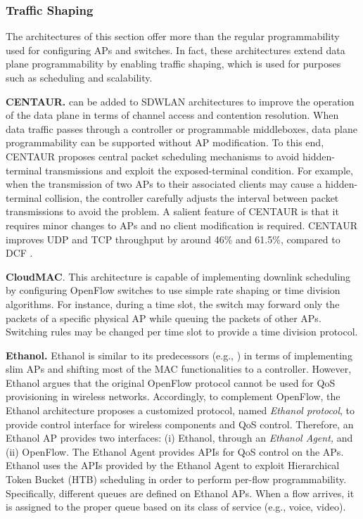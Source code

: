 \subsubsection{\textbf{Traffic Shaping}}
The architectures of this section offer more than the regular programmability used for configuring APs and switches.
In fact, these architectures extend data plane programmability by enabling traffic shaping, which is used for purposes such as scheduling and scalability.


\textbf{CENTAUR.} \cite{CENTAUR } can be added to SDWLAN architectures to improve the operation of the data plane in terms of channel access and contention resolution.
When data traffic passes through a controller or programmable middleboxes, data plane programmability can be supported without AP modification.
To this end, CENTAUR proposes central packet scheduling mechanisms to avoid hidden-terminal transmissions and exploit the exposed-terminal condition.
For example, when the transmission of two APs to their associated clients may cause a hidden-terminal collision, the controller carefully adjusts the interval between packet transmissions to avoid the problem.
A salient feature of CENTAUR is that it requires minor changes to APs and no client modification is required.
CENTAUR improves UDP and TCP throughput by around 46\% and 61.5\%, compared to DCF \cite{bianchi2005remarks}.


\textbf{CloudMAC}. This architecture \cite{CloudMAC} is capable of implementing downlink scheduling by configuring OpenFlow switches to use simple rate shaping or time division algorithms.
For instance, during a time slot, the switch may forward only the packets of a specific physical AP while queuing the packets of other APs. 
Switching rules may be changed per time slot to provide a time division protocol.



\textbf{Ethanol.}
\label{EthanolArch}
Ethanol \cite{Ethanol} is similar to its predecessors (e.g., \cite{Odin,CloudMAC}) in terms of implementing slim APs and shifting most of the MAC functionalities to a controller.
However, Ethanol argues that the original OpenFlow protocol cannot be used for QoS provisioning in wireless networks.
Accordingly, to complement OpenFlow, the Ethanol architecture proposes a customized protocol, named \textit{Ethanol protocol}, to provide control interface for wireless components and QoS control.
Therefore, an Ethanol AP provides two interfaces: (i) Ethanol, through an \textit{Ethanol Agent,} and (ii) OpenFlow. 
The Ethanol Agent provides APIs for QoS control on the APs.
Ethanol uses the APIs provided by the Ethanol Agent to exploit Hierarchical Token Bucket (HTB) \cite{Pantou} scheduling in order to perform per-flow programmability.
Specifically, different queues are defined on Ethanol APs. 
When a flow arrives, it is assigned to the proper queue based on its class of service (e.g., voice, video).

